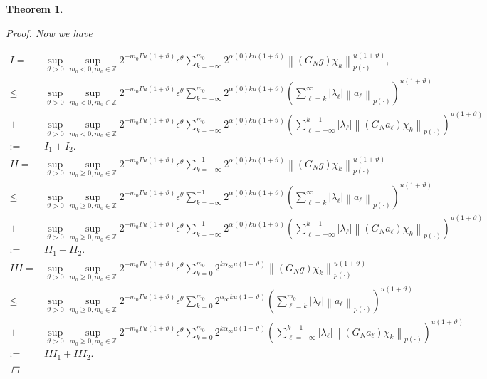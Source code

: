 \documentclass[oneside,reqno]{amsart}
\newtheorem{theorem}{Theorem}[section]
\numberwithin{equation}{section}
\theoremstyle{definition}
\begin{document}
\begin{theorem}
\begin{proof}
Now we have


\begin{align*}
I= & \sup_{\vartheta>0 }\sup _{m_0<0  , m_0\in  \mathbb{Z}} 2^{-m_0\Gamma u(1+\vartheta)} \epsilon  ^\theta \sum_{k=-\infty}^{m_0} 2^{  \alpha(0) k u(1+\vartheta)}\left\|\left(G_{N}g \right) \chi_{k}\right\|_{{p(\cdot)}}^{u(1+\vartheta)}, \\
\leq & \sup_{\vartheta>0 }\sup _{m_0<0  , m_0\in  \mathbb{Z}} 2^{-m_0\Gamma u(1+\vartheta)} \epsilon  ^\theta \sum_{k=-\infty}^{m_0} 2^{  \alpha(0) k u(1+\vartheta)}\left(\sum_{\ell=k}^{\infty}\left|\lambda_\ell \right|\left\|a_\ell \right\|_{{p(\cdot)}}\right)^{u(1+\vartheta)} \\
 +&\sup_{\vartheta>0 }\sup _{m_0<0  , m_0\in  \mathbb{Z}} 2^{-m_0\Gamma u(1+\vartheta)} \epsilon  ^\theta \sum_{k=-\infty}^{m_0} 2^{  \alpha(0) k u(1+\vartheta)}\left(\sum_{\ell=-\infty }^{k-1}\left|\lambda_\ell \right|\left\|\left(G_{N} a_\ell \right) \chi_{k}\right\|_{{p(\cdot)}}\right)^{u(1+\vartheta)} \\
:= & I_{1}+I_{2} . \\
I I= &  \sup_{\vartheta>0 }\sup _{m_0\geq 0, m_0\in  \mathbb{Z}} 2^{-m_0\Gamma u(1+\vartheta)} \epsilon  ^\theta\sum_{k=-\infty}^{-1} 2^{  \alpha(0) k u(1+\vartheta)}\left\|\left(G_{N}g \right) \chi_{k}\right\|_{{p(\cdot)}}^{u(1+\vartheta)} \\
\leq & \sup_{\vartheta>0 }\sup _{m_0\geq 0, m_0\in  \mathbb{Z}} 2^{-m_0\Gamma u(1+\vartheta)} \epsilon  ^\theta\sum_{k=-\infty}^{-1} 2^{  \alpha(0) k u(1+\vartheta)}\left(\sum_{\ell=k}^{\infty}\left|\lambda_\ell \right|\left\|a_\ell \right\|_{{p(\cdot)}}\right)^{u(1+\vartheta)} \\
 +&\sup_{\vartheta>0 }\sup _{m_0\geq 0, m_0\in  \mathbb{Z}} 2^{-m_0\Gamma u(1+\vartheta)} \epsilon  ^\theta\sum_{k=-\infty}^{-1} 2^{  \alpha(0) k u(1+\vartheta)}\left(\sum_{\ell=-\infty }^{k-1}\left|\lambda_\ell \right|\left\|\left(G_{N} a_\ell \right) \chi_{k}\right\|_{{p(\cdot)}}\right)^{u(1+\vartheta)} \\
:= & I I_{1}+I I_{2} .\\
I I I= & \sup_{\vartheta>0 }\sup _{m_0\geq 0, m_0\in  \mathbb{Z}} 2^{-m_0\Gamma u(1+\vartheta)} \epsilon  ^\theta \sum_{k=0}^{m_0} 2^{k  \alpha_{\infty}u(1+\vartheta)}\left\|\left(G_{N}g \right) \chi_{k}\right\|_{{p(\cdot)}}^{u(1+\vartheta)} \\
\leq  & \sup_{\vartheta>0 }\sup _{m_0\geq 0, m_0\in  \mathbb{Z}} 2^{-m_0\Gamma u(1+\vartheta)} \epsilon  ^\theta \sum_{k=0}^{m_0} 2^{ \alpha_{\infty} k u(1+\vartheta)}\left(\sum_{\ell=k}^{m_0}\left|\lambda_\ell \right|\left\|a_\ell \right\|_{{p(\cdot)}}\right)^{u(1+\vartheta)}\\
+&\sup_{\vartheta>0 }\sup _{m_0\geq 0, m_0\in  \mathbb{Z}} 2^{-m_0\Gamma u(1+\vartheta)} \epsilon  ^\theta\sum_{k=0}^{m_0} 2^{k  \alpha_{\infty}u(1+\vartheta)}\left(\sum_{\ell=-\infty }^{k-1}\left|\lambda_\ell \right|\left\|\left(G_{N} a_\ell \right) \chi_{k}\right\|_{{p(\cdot)}}\right)^{u(1+\vartheta)} \\
:= & I I I_{1}+I I I_{2} .
\end{align*}



\end{proof}
\end{theorem}
\end{document}
